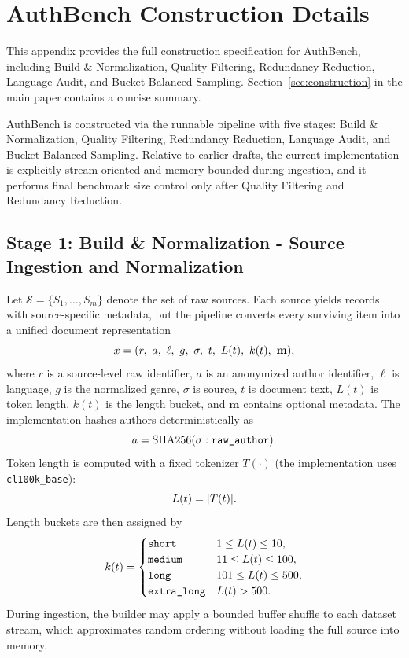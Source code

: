 \documentclass{article}
\begin{document}



\appendix

\section{AuthBench Construction Details}
\label{sec:appendix-construction-details}

This appendix provides the full construction specification for AuthBench, including Build \& Normalization, Quality Filtering, Redundancy Reduction, Language Audit, and Bucket Balanced Sampling.
Section~\ref{sec:construction} in the main paper contains a concise summary.

{\color{red}AuthBench is constructed via the runnable pipeline with five stages: Build \& Normalization, Quality Filtering, Redundancy Reduction, Language Audit, and Bucket Balanced Sampling. Relative to earlier drafts, the current implementation is explicitly stream-oriented and memory-bounded during ingestion, and it performs final benchmark size control only after Quality Filtering and Redundancy Reduction.}

\subsection{Stage 1: Build \& Normalization - Source Ingestion and Normalization}
\label{subsec:construct-ingest}
{\color{red}Let $\mathcal{S}=\{S_1,\dots,S_m\}$ denote the set of raw sources. Each source yields records with source-specific metadata, but the pipeline converts every surviving item into a unified document representation}
\[
{\color{red}x=(r,\ a,\ \ell,\ g,\ \sigma,\ t,\ L(t),\ k(t),\ \mathbf{m}),}
\]
{\color{red}where $r$ is a source-level raw identifier, $a$ is an anonymized author identifier, $\ell$ is language, $g$ is the normalized genre, $\sigma$ is source, $t$ is document text, $L(t)$ is token length, $k(t)$ is the length bucket, and $\mathbf{m}$ contains optional metadata. The implementation hashes authors deterministically as}
\[
{\color{red}a=\mathrm{SHA256}(\sigma : \texttt{raw\_author}).}
\]
{\color{red}Token length is computed with a fixed tokenizer $T(\cdot)$ (the implementation uses \texttt{cl100k\_base}):}
\[
{\color{red}L(t)=|T(t)|.}
\]
{\color{red}Length buckets are then assigned by}
\[
{\color{red}
k(t)=
\begin{cases}
\texttt{short} & 1 \le L(t) \le 10,\\
\texttt{medium} & 11 \le L(t) \le 100,\\
\texttt{long} & 101 \le L(t) \le 500,\\
\texttt{extra\_long} & L(t) > 500.
\end{cases}
}
\]
{\color{red}During ingestion, the builder may apply a bounded buffer shuffle to each dataset stream, which approximates random ordering without loading the full source into memory.}
\end{document}
